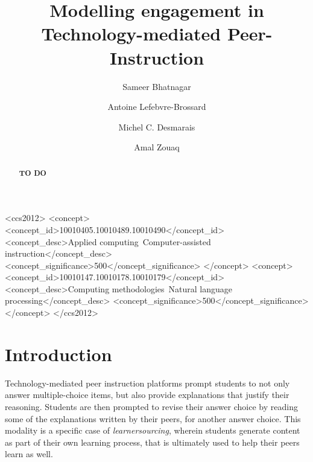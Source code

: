 \documentclass[sigconf]{acmart}
\begin{document}
\title{Modelling engagement in Technology-mediated 
Peer-Instruction}

\author{Sameer Bhatnagar}
\author{Antoine Lefebvre-Brossard}
\author{Michel C. Desmarais}
\author{Amal Zouaq}


\renewcommand{\shortauthors}{Bhatnagar, et al.}

\begin{abstract}
\textbf{TO DO}
\end{abstract}


\begin{CCSXML}
	<ccs2012>
	<concept>
	<concept_id>10010405.10010489.10010490</concept_id>
	<concept_desc>Applied 
	computing~Computer-assisted 
	instruction</concept_desc>
	<concept_significance>500</concept_significance>
	</concept>
	<concept>
	<concept_id>10010147.10010178.10010179</concept_id>
	<concept_desc>Computing methodologies~Natural 
	language processing</concept_desc>
	<concept_significance>500</concept_significance>
	</concept>
	</ccs2012>
\end{CCSXML}





\maketitle

\section{Introduction}

Technology-mediated peer instruction platforms 
\cite{univeristy_of_british_columbia_ubc/ubcpi_2019}\cite{charles_harnessing_2019}
prompt students to not only answer multiple-choice 
items, but also provide 
explanations that justify their reasoning. 
Students are then prompted to revise their answer 
choice by reading some of the 
explanations written by their peers, for another 
answer choice.
This modality is a specific case of 
\textit{learnersourcing}\cite{weir_learnersourcing_2015},
 wherein students 
generate content as part of their own learning 
process, that is ultimately 
used to help their peers learn as well. 
\end{document}
